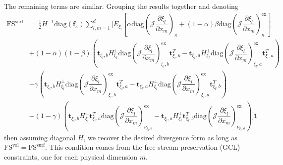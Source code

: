 \documentclass[12pt,a4paper]{article}
\newcommand{\pder}[2][]{\dfrac{\partial #1}{\partial #2}} %
\newcommand{\fn}[1]{\mathcal{#1}} %
\begin{document}
The remaining terms are similar. Grouping the results together and denoting
\begin{align*}
\text{FS}^{\text{surf}} &= \frac{1}{2} H^{-1} \text{diag} \left( \bm{f}_\kappa \right) \sum_{l,m=1}^d \Bigg[ E_{\xi_l} \left[ \alpha \text{diag}  \left( \fn{J} \pder[\xi_l]{x_m} \right)_{\kappa} + (1-\alpha) \beta \text{diag}  \left( \fn{J} \pder[\xi_l]{x_m} \right)_{\kappa}^\text{ex} \right]  \\
& + (1-\alpha) (1- \beta) \left(  \bm{t}_{\xi_l, b} H^{\bot}_{\xi_l}  \text{diag} \left( \fn{J} \pder[\xi_l]{x_m} \right)_{\xi_l, b}^\text{ex} \bm{t}_{\xi_l, b}^T -  \bm{t}_{\xi_l, a} H^{\bot}_{\xi_l}  \text{diag} \left( \fn{J} \pder[\xi_l]{x_m} \right)_{\xi_l , a}^\text{ex} \bm{t}_{\xi_l, a}^T \right)  \\ 
& - \gamma \left( \bm{t}_{\xi_l, b} H^{\bot}_{\xi_l}  \text{diag} \left( \fn{J} \pder[\xi_l]{x_m} \right)_{\xi_l,b}^\text{ex} \bm{t}_{\xi_l, a}^T  - \bm{t}_{\xi_l, a} H^{\bot}_{\xi_l} \text{diag} \left( \fn{J} \pder[\xi_l]{x_m} \right)_{\xi_l,a}^\text{ex} \bm{t}_{\xi_l, b}^T  \right) \\
& - (1-\gamma) \left(  \bm{t}_{\xi_l, b} H^{\bot}_{\xi_l} \bm{t}_{\xi_l, a}^T \text{diag} \left( \fn{J} \pder[\xi_l]{x_m} \right)_{\nu_{\xi_l,b}}^\text{ex} -  \bm{t}_{\xi_l, a} H^{\bot}_{\xi_l} \bm{t}_{\xi_l, b}^T \text{diag} \left( \fn{J} \pder[\xi_l]{x_m} \right)_{\nu_{\xi_l,a}}^\text{ex} \right)  \Bigg] \bm{1}
\end{align*}
then assuming diagonal $H$, we recover the desired divergence form as long as $\text{FS}^{\text{vol}} = \text{FS}^{\text{surf}}$. This condition comes from the free stream preservation (GCL) constraints, one for each physical dimension $m$.
\end{document}
